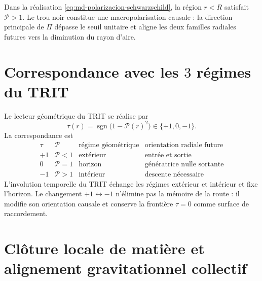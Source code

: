 \begin{corollary}
\label{cor:md-macropolarizacion-interior}
Dans la réalisation \eqref{eq:md-polarizacion-schwarzschild}, la région
\(r<R\) satisfait \(\mathcal P>1\). Le trou noir constitue une
macropolarisation causale : la direction principale de \(\Pi\) dépasse le seuil
unitaire et aligne les deux familles radiales futures vers la diminution du
rayon d'aire.
\end{corollary}

\section{Correspondance avec les \texorpdfstring{\(3\)}{3} régimes du TRIT}
\label{sec:md-polarizacion-trit}

Le lecteur géométrique du TRIT se réalise par
\begin{equation}
 \tau(r)=\operatorname{sgn}\!\bigl(1-\mathcal P(r)^2\bigr)
 \in\{+1,0,-1\}.
 \label{eq:md-polarizacion-lector-trit}
\end{equation}
La correspondance est
\begin{equation}
 \begin{array}{c|c|c|c}
 \tau & \mathcal P & \text{régime géométrique} &
 \text{orientation radiale future}\\ \hline
 +1 & \mathcal P<1 & \text{extérieur} & \text{entrée et sortie}\\
 0  & \mathcal P=1 & \text{horizon} & \text{génératrice nulle sortante}\\
 -1 & \mathcal P>1 & \text{intérieur} & \text{descente nécessaire}
 \end{array}
 \label{eq:md-polarizacion-tabla-trit}
\end{equation}
L'involution temporelle du TRIT échange les régimes extérieur et intérieur
et fixe l'horizon. Le changement \(+1\leftrightarrow-1\) n'élimine pas la mémoire
de la route : il modifie son orientation causale et conserve la frontière
\(\tau=0\) comme surface de raccordement.

\section{Clôture locale de matière et alignement gravitationnel collectif}
\label{sec:md-polarizacion-materia}

